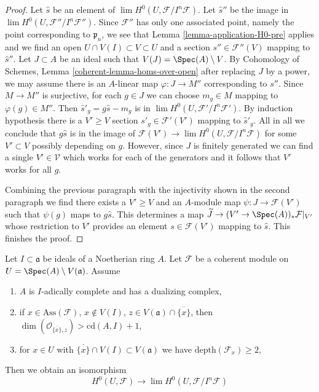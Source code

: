\begin{proof}
\medskip\noindent
Let $\hat s$ be an element of $\lim H^0(U, \mathcal{F}/I^n\mathcal{F})$.
Let $\hat s''$ be the image in $\lim H^0(U, \mathcal{F}''/I^n\mathcal{F}'')$.
Since $\mathcal{F}''$ has only one associated point, namely the point
corresponding to $\mathfrak p_n$, we see that
Lemma \ref{lemma-application-H0-pre} applies and we find an open
$U \cap V(I) \subset V \subset U$
and a section $s'' \in \mathcal{F}''(V)$ mapping to $\hat s''$.
Let $J \subset A$ be an ideal such that $V(J) = \Spec(A) \setminus V$.
By Cohomology of Schemes, Lemma \ref{coherent-lemma-homs-over-open}
after replacing $J$ by a power, we may assume
there is an $A$-linear map $\varphi : J \to M''$
corresponding to $s''$. Since $M \to M''$ is surjective, for
each $g \in J$ we can choose $m_g \in M$ mapping to
$\varphi(g) \in M''$. Then $\hat s'_g = g \hat s - m_g$
is in $\lim H^0(U, \mathcal{F}'/I^n\mathcal{F}')$.
By induction hypothesis there is a $V' \geq V$
section $s'_g \in \mathcal{F}'(V')$
mapping to $\hat s'_g$. All in all we conclude that
$g \hat s$ is in the image of
$\mathcal{F}(V') \to \lim H^0(U, \mathcal{F}/I^n\mathcal{F})$
for some $V' \subset V$ possibly depending on $g$.
However, since $J$ is finitely generated we can find a single
$V' \in \mathcal{V}$ which works for each of the generators
and it follows that $V'$ works for all $g$.

\medskip\noindent
Combining the previous paragraph with the injectivity
shown in the second paragraph we find there exists
a $V' \geq V$ and an $A$-module map $\psi : J \to \mathcal{F}(V')$
such that $\psi(g)$ maps to $g\hat s$. This determines a
map $\widetilde{J} \to (V' \to \Spec(A))_*\mathcal{F}|_{V'}$
whose restriction to $V'$ provides an element
$s \in \mathcal{F}(V')$ mapping to $\hat s$.
This finishes the proof.
\end{proof}

\begin{lemma}
\label{lemma-application-H0}
Let $I \subset \mathfrak a$ be ideals of a Noetherian ring $A$.
Let $\mathcal{F}$ be a coherent module on
$U = \Spec(A) \setminus V(\mathfrak a)$.
Assume
\begin{enumerate}
\item $A$ is $I$-adically complete and has a dualizing complex,
\item if $x \in \text{Ass}(\mathcal{F})$, $x \not \in V(I)$,
$z \in V(\mathfrak a) \cap \overline{\{x\}}$, then
$\dim(\mathcal{O}_{\overline{\{x\}}, z}) > \text{cd}(A, I) + 1$,
\item for $x \in U$ with $\overline{\{x\}} \cap V(I) \subset V(\mathfrak a)$
we have $\text{depth}(\mathcal{F}_x) \geq 2$,
\end{enumerate}
Then we obtain an isomorphism
$$
H^0(U, \mathcal{F})
\longrightarrow
\lim H^0(U, \mathcal{F}/I^n\mathcal{F})
$$
\end{lemma}

